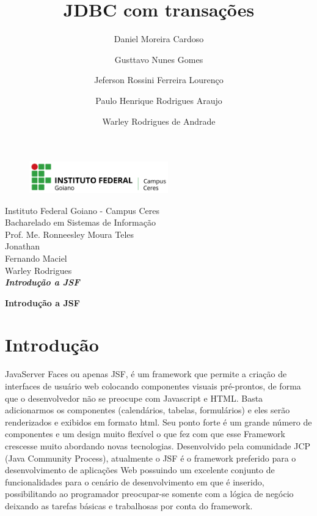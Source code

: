 \documentclass[12pt,a4paper]{article}
\title{JDBC com transações}
\author{Daniel Moreira Cardoso \and Gusttavo Nunes Gomes\and Jeferson Rossini Ferreira Lourenço\and Paulo Henrique Rodrigues Araujo\and Warley Rodrigues de Andrade}
\begin{document}
\begin{titlepage}
\begin{center}
\begin{figure}[htb]
                
                \label{figura:LogoIF}
        
                \centering
                \includegraphics[width=6cm]{recursos/imagens/logo.png} 
\end{figure}
Instituto Federal Goiano - Campus Ceres\\
Bacharelado em Sistemas de Informação\\
Prof. Me. Ronneesley Moura Teles\\\vspace{0.5cm}
Jonathan\\
Fernando Maciel\\
Warley Rodrigues\\
\vspace{5.0cm}
\textit{\textbf{\Large{Introdução a JSF}}}\\\vspace{0.5cm}
\vspace{9.5cm}
\end{center}
\end{titlepage}
\tableofcontents
\newpage
\begin{center}
\textbf{\Large{Introdução a JSF}}\\\vspace{0.5cm}
\end{center}
\section{Introdução}
JavaServer Faces ou apenas JSF, é um framework que permite a criação de interfaces de usuário web colocando componentes visuais pré-prontos, de forma que o desenvolvedor não se preocupe com Javascript e HTML. Basta adicionarmos os componentes (calendários, tabelas, formulários) e eles serão renderizados e exibidos em formato html. Seu ponto forte é um grande número de componentes e um design muito flexível o que fez com que esse Framework crescesse muito abordando novas tecnologias.
Desenvolvido pela comunidade JCP (Java Community Process), atualmente o JSF é o framework preferido para o desenvolvimento de aplicações Web possuindo um excelente conjunto de funcionalidades para o cenário de desenvolvimento em que é inserido, possibilitando ao programador preocupar-se somente com a lógica de negócio deixando as tarefas básicas e trabalhosas por conta do framework.
\end{document}

